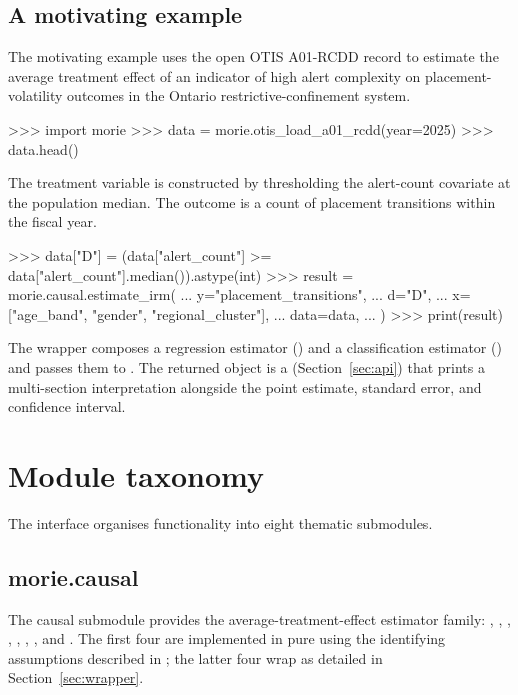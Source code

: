\documentclass[article,shortnames,nojss]{jss}
\newcommand{\OTIS}{\textsf{OTIS}}
\begin{document}
\subsection{A motivating example}

The motivating example uses the open \OTIS{} A01-RCDD record to
estimate the average treatment effect of an indicator of high
alert complexity on placement-volatility outcomes in the Ontario
restrictive-confinement system.

\begin{Code}
>>> import morie
>>> data = morie.otis_load_a01_rcdd(year=2025)
>>> data.head()
\end{Code}

\noindent The treatment variable is constructed by thresholding
the alert-count covariate at the population median. The outcome is
a count of placement transitions within the fiscal year.

\begin{Code}
>>> data["D"] = (data["alert_count"] >= data["alert_count"].median()).astype(int)
>>> result = morie.causal.estimate_irm(
...     y="placement_transitions",
...     d="D",
...     x=["age_band", "gender", "regional_cluster"],
...     data=data,
... )
>>> print(result)
\end{Code}

\noindent The  wrapper composes a
 regression estimator
() and a classification estimator
() and passes them to
. The returned object is a
 (Section~\ref{sec:api}) that prints a
multi-section interpretation alongside the point estimate,
standard error, and confidence interval.

\section{Module taxonomy}
\label{sec:taxonomy}

The   interface organises
functionality into eight thematic submodules.

\subsection{morie.causal}

The causal submodule provides the average-treatment-effect
estimator family:
, ,
, ,
, ,
, and . The first four
are implemented in pure  using the identifying
assumptions described in \citet{Ruhela2026MRM}; the latter four
wrap  as detailed in Section~\ref{sec:wrapper}.
\end{document}
